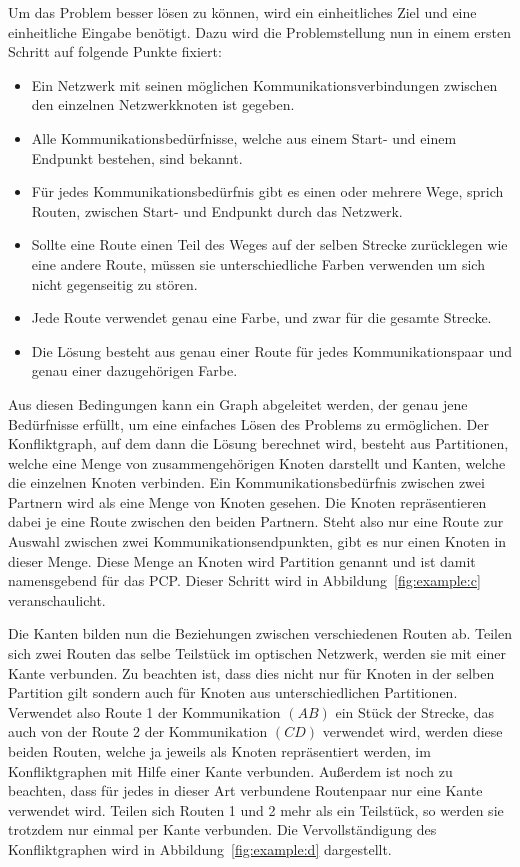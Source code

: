 Um das Problem besser lösen zu können, wird ein einheitliches Ziel und eine einheitliche Eingabe benötigt. Dazu wird die Problemstellung nun in einem ersten Schritt auf folgende Punkte fixiert:
\begin{itemize}
	\item Ein Netzwerk mit seinen möglichen Kommunikationsverbindungen zwischen den einzelnen Netzwerkknoten ist gegeben.
	\item Alle Kommunikationsbedürfnisse, welche aus einem Start- und einem Endpunkt bestehen, sind bekannt.
	\item Für jedes Kommunikationsbedürfnis gibt es einen oder mehrere Wege, sprich Routen, zwischen Start- und Endpunkt durch das Netzwerk.
	\item Sollte eine Route einen Teil des Weges auf der selben Strecke zurücklegen wie eine andere Route, müssen sie unterschiedliche Farben verwenden um sich nicht gegenseitig zu stören.
	\item Jede Route verwendet genau eine Farbe, und zwar für die gesamte Strecke.
	\item Die Lösung besteht aus genau einer Route für jedes Kommunikationspaar und genau einer dazugehörigen Farbe.
\end{itemize}

Aus diesen Bedingungen kann ein Graph abgeleitet werden, der genau jene Bedürfnisse erfüllt, um eine einfaches Lösen des Problems zu ermöglichen. Der Konfliktgraph, auf dem dann die Lösung berechnet wird, besteht aus Partitionen, welche eine Menge von zusammengehörigen Knoten darstellt und Kanten, welche die einzelnen Knoten verbinden. Ein Kommunikationsbedürfnis zwischen zwei Partnern wird als eine Menge von Knoten gesehen. Die Knoten repräsentieren dabei je eine Route zwischen den beiden Partnern. Steht also nur eine Route zur Auswahl zwischen zwei Kommunikationsendpunkten, gibt es nur einen Knoten in dieser Menge. Diese Menge an Knoten wird Partition genannt und ist damit namensgebend für das PCP\@. Dieser Schritt wird in Abbildung~\ref{fig:example:c} veranschaulicht.

Die Kanten bilden nun die Beziehungen zwischen verschiedenen Routen ab. Teilen sich zwei Routen das selbe Teilstück im optischen Netzwerk, werden sie mit einer Kante verbunden. Zu beachten ist, dass dies nicht nur für Knoten in der selben Partition gilt sondern auch für Knoten aus unterschiedlichen Partitionen. Verwendet also Route 1 der Kommunikation $(AB)$ ein Stück der Strecke, das auch von der Route 2 der Kommunikation $(CD)$ verwendet wird, werden diese beiden Routen, welche ja jeweils als Knoten repräsentiert werden, im Konfliktgraphen mit Hilfe einer Kante verbunden. Außerdem ist noch zu beachten, dass für jedes in dieser Art verbundene Routenpaar nur eine Kante verwendet wird. Teilen sich Routen 1 und 2 mehr als ein Teilstück, so werden sie trotzdem nur einmal per Kante verbunden. Die Vervollständigung des Konfliktgraphen wird in Abbildung~\ref{fig:example:d} dargestellt.

